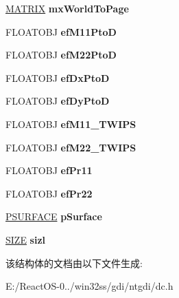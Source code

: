 \begin{DoxyCompactItemize}
\hyperlink{struct_m_a_t_r_i_x}{M\+A\+T\+R\+IX} {\bfseries mx\+World\+To\+Page}
\item 
\mbox{\label{struct___d_c_l_e_v_e_l_ad299b327ef9f2a45be62080f5228e27c}} 
F\+L\+O\+A\+T\+O\+BJ {\bfseries ef\+M11\+PtoD}
\item 
\mbox{\label{struct___d_c_l_e_v_e_l_a6dc3948fe14ece0b9fd639b5eb37b0df}} 
F\+L\+O\+A\+T\+O\+BJ {\bfseries ef\+M22\+PtoD}
\item 
\mbox{\label{struct___d_c_l_e_v_e_l_ada87a20962df2397e2ff37ea2ec16f8a}} 
F\+L\+O\+A\+T\+O\+BJ {\bfseries ef\+Dx\+PtoD}
\item 
\mbox{\label{struct___d_c_l_e_v_e_l_a5edc93906579769cf74a901e351f02e4}} 
F\+L\+O\+A\+T\+O\+BJ {\bfseries ef\+Dy\+PtoD}
\item 
\mbox{\label{struct___d_c_l_e_v_e_l_a4968bb460b8605bbe5f2a36c4216edab}} 
F\+L\+O\+A\+T\+O\+BJ {\bfseries ef\+M11\+\_\+\+T\+W\+I\+PS}
\item 
\mbox{\label{struct___d_c_l_e_v_e_l_a89470e6ff2998946bcd0c6332210722a}} 
F\+L\+O\+A\+T\+O\+BJ {\bfseries ef\+M22\+\_\+\+T\+W\+I\+PS}
\item 
\mbox{\label{struct___d_c_l_e_v_e_l_a32bcf2cd592037040a9e3aede080f070}} 
F\+L\+O\+A\+T\+O\+BJ {\bfseries ef\+Pr11}
\item 
\mbox{\label{struct___d_c_l_e_v_e_l_a242076da2419e8dbe8a27d11f440a4be}} 
F\+L\+O\+A\+T\+O\+BJ {\bfseries ef\+Pr22}
\item 
\mbox{\label{struct___d_c_l_e_v_e_l_a2b0155eef23630acd57e759282ccbdda}} 
\hyperlink{struct___s_u_r_f_a_c_e}{P\+S\+U\+R\+F\+A\+CE} {\bfseries p\+Surface}
\item 
\mbox{\label{struct___d_c_l_e_v_e_l_affc875e14a24288372f5987563a6445e}} 
\hyperlink{structtag_s_i_z_e}{S\+I\+ZE} {\bfseries sizl}
\end{DoxyCompactItemize}


该结构体的文档由以下文件生成\+:\begin{DoxyCompactItemize}
\item 
E\+:/\+React\+O\+S-\/0../win32ss/gdi/ntgdi/dc.\+h\end{DoxyCompactItemize}
